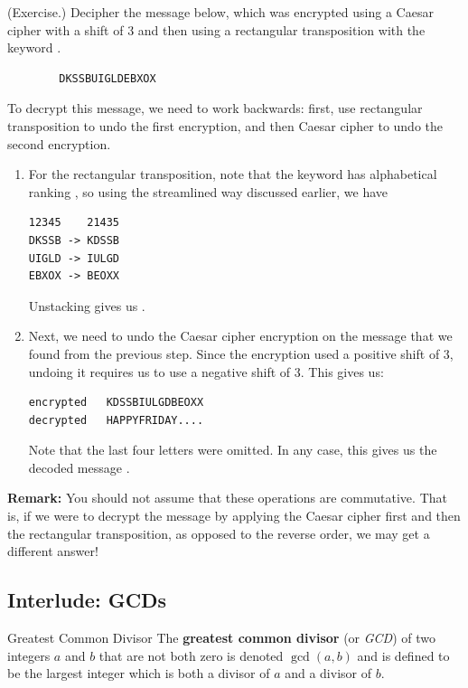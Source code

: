 \documentclass[letterpaper]{article}
\newcommand{\0}{\mathbf{0}}
\begin{document}
\begin{mdframed}
    (Exercise.) Decipher the message below, which was encrypted using a Caesar cipher with a shift of 3 and then using a rectangular transposition with the keyword .
    \begin{verbatim}
        DKSSBUIGLDEBXOX\end{verbatim}

    \begin{mdframed}
        To decrypt this message, we need to work backwards: first, use rectangular transposition to undo the first encryption, and then Caesar cipher to undo the second encryption.
        \begin{enumerate}
            \item For the rectangular transposition, note that the keyword has alphabetical ranking , so using the streamlined way discussed earlier, we have 
            \begin{mdframed}
                \begin{verbatim}
12345    21435
DKSSB -> KDSSB
UIGLD -> IULGD
EBXOX -> BEOXX\end{verbatim}
            \end{mdframed}
            Unstacking gives us .

            \item Next, we need to undo the Caesar cipher encryption on the message that we found from the previous step. Since the encryption used a positive shift of 3, undoing it requires us to use a negative shift of 3. This gives us: 
            \begin{mdframed}
                \begin{verbatim}
encrypted   KDSSBIULGDBEOXX
decrypted   HAPPYFRIDAY....\end{verbatim}
            \end{mdframed}
            Note that the last four letters were omitted. In any case, this gives us the decoded message .
        \end{enumerate}
    \end{mdframed}
\end{mdframed}
\textbf{Remark:} You should not assume that these operations are commutative. That is, if we were to decrypt the message by applying the Caesar cipher first and then the rectangular transposition, as opposed to the reverse order, we may get a different answer!


\subsection{Interlude: GCDs}
\begin{definition}{Greatest Common Divisor}{}
    The \textbf{greatest common divisor} (or \emph{GCD}) of two integers $a$ and $b$ that are not both zero is denoted $\gcd(a, b)$ and is defined to be the largest integer which is both a divisor of $a$ and a divisor of $b$.
\end{definition}
\end{document}
